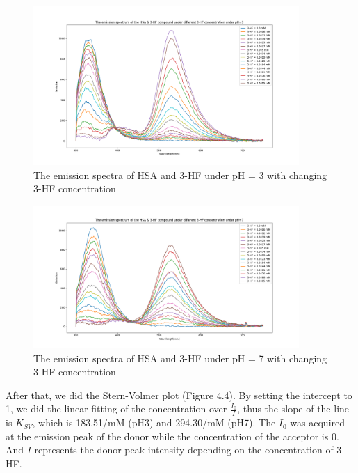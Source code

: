 \documentclass[a4paper,english,12pt,bibliography=totoc]{scrreprt}
\begin{document}
\begin{figure}[h]
    \centering
    \includegraphics[width = 0.9\textwidth]{Figures/emission_ph3.png}
    \caption{The emission spectra of HSA and 3-HF under pH = 3 with changing 3-HF concentration}
    \label{fig:enter-label}
\end{figure}
\begin{figure}[h]
    \centering
    \includegraphics[width = 0.9\textwidth]{Figures/emission_ph7.png}
    \caption{The emission spectra of HSA and 3-HF under pH = 7 with changing 3-HF concentration}
    \label{fig:enter-label}
\end{figure}

After that, we did the Stern-Volmer plot (Figure 4.4). By setting the intercept to 1, we did the linear fitting of the concentration over $\frac{I_0}{I}$, thus the slope of the line is $K_{SV}$, which is 183.51/mM (pH3) and 294.30/mM (pH7). The $I_0$ was acquired at the emission peak of the donor while the concentration of the acceptor is 0. And $I$ represents the donor peak intensity depending on the concentration of 3-HF.\\

\end{document}
